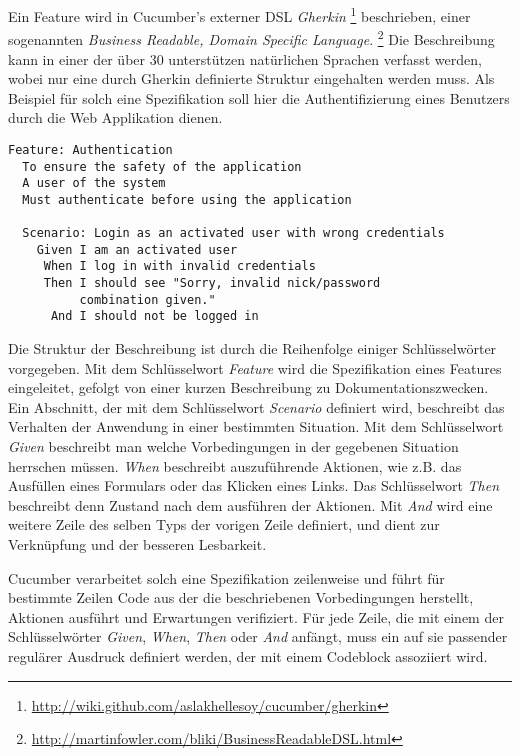 Ein Feature wird in Cucumber's externer DSL \textit{Gherkin}
\footnote{\url{http://wiki.github.com/aslakhellesoy/cucumber/gherkin}}
beschrieben, einer sogenannten \textit{Business Readable, Domain
  Specific Language}.
\footnote{\url{http://martinfowler.com/bliki/BusinessReadableDSL.html}}
Die Beschreibung kann in einer der über 30 unterstützen natürlichen
Sprachen verfasst werden, wobei nur eine durch Gherkin definierte
Struktur eingehalten werden muss. Als Beispiel für solch eine
Spezifikation soll hier die Authentifizierung eines Benutzers durch
die Web Applikation dienen.

\begin{lstlisting}[caption=Spezifikation eines Features mit Cucumber]
Feature: Authentication
  To ensure the safety of the application
  A user of the system
  Must authenticate before using the application

  Scenario: Login as an activated user with wrong credentials
    Given I am an activated user
     When I log in with invalid credentials
     Then I should see "Sorry, invalid nick/password
          combination given."
      And I should not be logged in
\end{lstlisting}

Die Struktur der Beschreibung ist durch die Reihenfolge einiger
Schlüssel\-wörter vorgegeben. Mit dem Schlüsselwort \textit{Feature}
wird die Spezifikation eines Features eingeleitet, gefolgt von einer
kurzen Beschreibung zu Dokumentationszwecken. Ein Abschnitt, der mit
dem Schlüsselwort \textit{Scenario} definiert wird, beschreibt das
Verhalten der Anwendung in einer bestimmten Situation. Mit dem
Schlüsselwort \textit{Given} beschreibt man welche Vorbedingungen in
der gegebenen Situation herrschen müssen. \textit{When} beschreibt
auszuführende Aktionen, wie z.B. das Ausfüllen eines Formulars oder
das Klicken eines Links. Das Schlüsselwort \textit{Then} beschreibt
denn Zustand nach dem ausführen der Aktionen. Mit \textit{And} wird
eine weitere Zeile des selben Typs der vorigen Zeile definiert, und
dient zur Verknüpfung und der besseren Lesbarkeit.

Cucumber verarbeitet solch eine Spezifikation zeilenweise und führt
für bestimmte Zeilen Code aus der die beschriebenen Vorbedingungen
herstellt, Aktionen ausführt und Erwartungen verifiziert. Für jede
Zeile, die mit einem der Schlüsselwörter \textit{Given},
\textit{When}, \textit{Then} oder \textit{And} anfängt, muss ein auf
sie passender regulärer Ausdruck definiert werden, der mit einem
Codeblock assoziiert wird.

